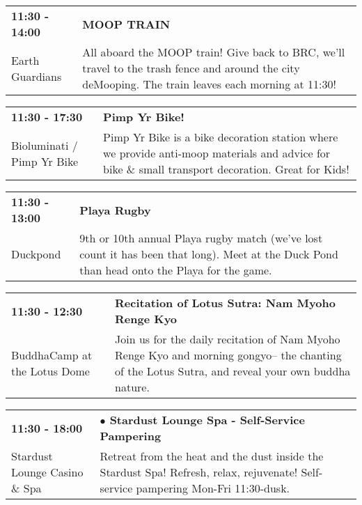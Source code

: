 \begin{tabular}{ p{1in} p{2.2in} }
    \textbf{11:30 - 14:00} & \textbf{MOOP TRAIN } \\
    Earth Guardians \newline  & All aboard the MOOP train! Give back to BRC, we'll travel to the trash fence and around the city deMooping. The train leaves each morning at 11:30! \\
    \hline 
\end{tabular}
    
\begin{tabular}{ p{1in} p{2.2in} }
    \textbf{11:30 - 17:30} & \textbf{Pimp Yr Bike!} \\
    Bioluminati / Pimp Yr Bike \newline  & Pimp Yr Bike is a bike decoration station where we provide anti-moop materials and advice for bike \& small transport decoration. Great for Kids! \\
    \hline 
\end{tabular}
    
\begin{tabular}{ p{1in} p{2.2in} }
    \textbf{11:30 - 13:00} & \textbf{Playa Rugby} \\
    Duckpond \newline  & 9th or 10th annual Playa rugby match (we've lost count it has been that long). Meet at the Duck Pond than head onto the Playa for the game. \\
    \hline 
\end{tabular}
    
\begin{tabular}{ p{1in} p{2.2in} }
    \textbf{11:30 - 12:30} & \textbf{Recitation of Lotus Sutra: Nam Myoho Renge Kyo} \\
    BuddhaCamp at the Lotus Dome \newline  & Join us for the daily recitation of Nam Myoho Renge Kyo and morning gongyo-- the chanting of the Lotus Sutra, and reveal your own buddha nature. \\
    \hline 
\end{tabular}
    
\begin{tabular}{ p{1in} p{2.2in} }
    \textbf{11:30 - 18:00} & \textbf{$\bullet$	Stardust Lounge Spa - Self-Service Pampering} \\
    Stardust Lounge Casino \& Spa \newline  & Retreat from the heat and the dust inside the Stardust Spa! Refresh, relax, rejuvenate! Self-service pampering Mon-Fri 11:30-dusk. \\
    \hline 
\end{tabular}
    
